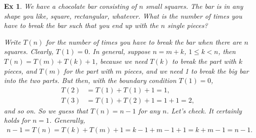 \documentclass[a4paper,11pt]{article}
\newtheorem{exercise}[theorem]{Ex}
\begin{document}
\begin{exercise}
We have a chocolate bar consisting of $n$ small squares.
The bar is in any shape you like, square, rectangular, whatever.
What is the number of times you have to break the bar such that you end up with the $n$ single pieces?
\begin{solution}
  Write $T(n)$ for the number of times you have to break the bar when there are $n$ squares.
  Clearly, $T(1) =0$.
  In general, suppose $n=m+k$, $1 \leq k < n$, then $T(n) = T(m) + T(k) + 1$, because we need $T(k)$ to break the part with $k$ pieces, and $T(m)$ for the part with $m$ pieces, and we need 1 to break the big bar into the two parts. But then, with the \emph{boundary condition} $T(1)=0$,
  \begin{align*}
    T(2) &= T(1) + T(1) + 1 = 1, \\
T(3) &= T(1) + T(2) + 1 = 1 + 1 = 2,
  \end{align*}
and so on. So we guess that $T(n)=n-1$ for any $n$. Let's check. It certainly holds for $n=1$.  Generally,
\begin{align*}
n-1 = T(n) = T(k) + T(m) + 1 = k-1 + m-1 + 1 = k+m-1 = n-1.
\end{align*}
\end{solution}
\end{exercise}
\end{document}
